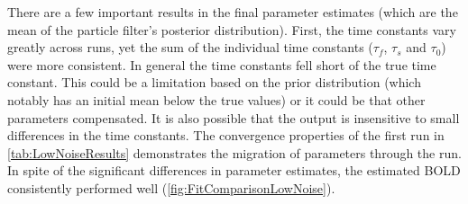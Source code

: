 There are a few important results in the final parameter estimates (which 
are the mean of the particle filter's posterior distribution). First, the time constants vary 
greatly across
runs, yet the sum of the individual time constants
($\tau_f$, $\tau_s$ and $\tau_0$) were more consistent. In general the 
time constants fell short of the true time constant. This could be a limitation
based on the prior distribution (which notably has an initial mean below the true values) 
or it could be that other parameters compensated. It is also possible that the output is insensitive
to small differences in the time constants.  
The convergence properties of the first run in \autoref{tab:LowNoiseResults} 
demonstrates the migration of parameters through the run. In spite of the
significant differences in parameter estimates, the estimated BOLD
consistently performed well 
(\autoref{fig:FitComparisonLowNoise}).


%

